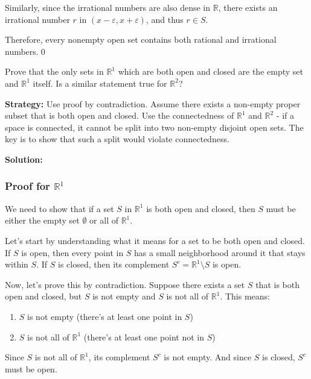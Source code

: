 Similarly, since the irrational numbers are also dense in $\mathbb{R}$, there exists an irrational number $r$ in $(x-\varepsilon, x+\varepsilon)$, and thus $r \in S$.

Therefore, every nonempty open set contains both rational and irrational numbers.\qed


\begin{problembox}
Prove that the only sets in $\mathbb{R}^1$ which are both open and closed are the empty set and $\mathbb{R}^1$ itself. Is a similar statement true for $\mathbb{R}^2$?
\end{problembox}

\noindent\textbf{Strategy:} Use proof by contradiction. Assume there exists a non-empty proper subset that is both open and closed. Use the connectedness of $\mathbb{R}^1$ and $\mathbb{R}^2$ - if a space is connected, it cannot be split into two non-empty disjoint open sets. The key is to show that such a split would violate connectedness.

\bigskip\noindent\textbf{Solution:}

\subsubsection*{Proof for $\mathbb{R}^1$}

We need to show that if a set $S$ in $\mathbb{R}^1$ is both open and closed, then $S$ must be either the empty set $\emptyset$ or all of $\mathbb{R}^1$.

Let's start by understanding what it means for a set to be both open and closed. If $S$ is open, then every point in $S$ has a small neighborhood around it that stays within $S$. If $S$ is closed, then its complement $S^c = \mathbb{R}^1 \setminus S$ is open.

Now, let's prove this by contradiction. Suppose there exists a set $S$ that is both open and closed, but $S$ is not empty and $S$ is not all of $\mathbb{R}^1$. This means:
\begin{enumerate}
\item $S$ is not empty (there's at least one point in $S$)
\item $S$ is not all of $\mathbb{R}^1$ (there's at least one point not in $S$)
\end{enumerate}

Since $S$ is not all of $\mathbb{R}^1$, its complement $S^c$ is not empty. And since $S$ is closed, $S^c$ must be open.

